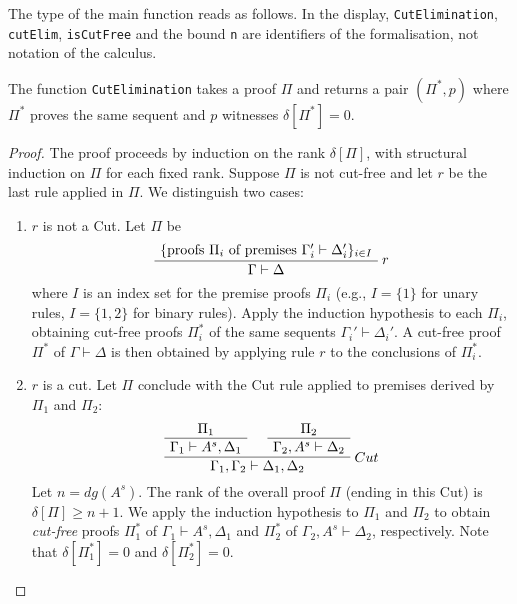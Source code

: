\documentclass{article}
\newcommand{\seq}[2]{{#1} \vdash{} {#2}}
\newcommand{\pf}[2]{{#1}^{#2}} %
\theoremstyle{definition}
\begin{document}
The type of the main function reads as follows. In the display, \texttt{CutElimination},
\texttt{cutElim}, \texttt{isCutFree} and the bound \texttt{n} are identifiers of the
formalisation, not notation of the calculus.


\noindent
The function \texttt{CutElimination} takes a proof $\Pi$ and returns a pair $(\Pi^*, p)$ where $\Pi^*$ proves the same sequent and $p$ witnesses $\delta[\Pi^*] = 0$.

\begin{proof}

The proof proceeds by induction on the rank $\delta[\Pi]$, with structural induction on $\Pi$ for each fixed rank.
Suppose $\Pi$ is not cut-free and let $r$ be the last rule applied in $\Pi$. We distinguish two cases:
\begin{enumerate}
    \item $r$ is not a Cut.
        Let $\Pi$ be
        \[
        \AxiomC{$\{\text{proofs } \Pi_i \text{ of premises } \seq{\Gamma_i'}{\Delta_i'}\}_{i \in I}$}
        \RightLabel{$r$}
        \UnaryInfC{$\seq{\Gamma}{\Delta}$} %
        \DisplayProof %
        \]
        where $I$ is an index set for the premise proofs $\Pi_i$ (e.g., $I=\{1\}$ for unary rules, $I=\{1,2\}$ for binary rules).
        Apply the induction hypothesis to each $\Pi_i$, obtaining cut-free proofs $\Pi_i^*$ of the same sequents $\seq{\Gamma_i'}{\Delta_i'}$.
        A cut-free proof $\Pi^*$ of $\seq{\Gamma}{\Delta}$ is then obtained by applying rule $r$ to the conclusions of $\Pi_i^*$.

    \item $r$ is a cut.
        Let $\Pi$ conclude with the Cut rule applied to premises derived by $\Pi_1$ and $\Pi_2$:
        \[
        \AxiomC{$\Pi_1$}
        \UnaryInfC{$\seq{\Gamma_1}{\pf{A}{s}, \Delta_1}$}
        \AxiomC{$\Pi_2$}
        \UnaryInfC{$\seq{\Gamma_2, \pf{A}{s}}{\Delta_2}$}
        \RightLabel{$Cut$}
        \BinaryInfC{$\seq{\Gamma_1, \Gamma_2}{\Delta_1, \Delta_2}$} %
        \DisplayProof
        \]
        Let $n = dg(\pf{A}{s})$. The rank of the overall proof $\Pi$ (ending in this Cut) is $\delta[\Pi] \ge n+1$.
        We apply the induction hypothesis to $\Pi_1$ and $\Pi_2$ to obtain
        \emph{cut-free} proofs $\Pi_1^*$ of $\seq{\Gamma_1}{\pf{A}{s}, \Delta_1}$ and $\Pi_2^*$ of $\seq{\Gamma_2, \pf{A}{s}}{\Delta_2}$, respectively.
        Note that $\delta[\Pi_1^*] = 0$ and $\delta[\Pi_2^*] = 0$.


\end{enumerate}
\end{proof}
\end{document}
